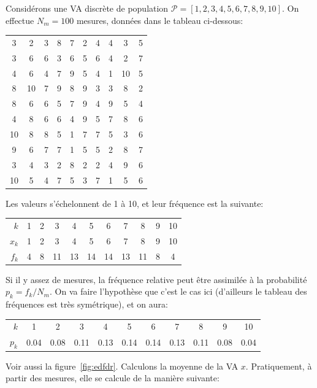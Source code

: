 Considérons une VA discrète de population $\mathcal{P}=[1,2,3,4,5,6,7,8,9,10]$. On effectue $N_m=100$ mesures, données dans le tableau ci-dessous:
\begin{center}
    \begin{tabular}{cccccccccc}
        3  & 2  & 3 & 8 & 7 & 2 & 4 & 4 & 3  & 5 \\
        3  & 6  & 6 & 3 & 6 & 5 & 6 & 4 & 2  & 7 \\
        4  & 6  & 4 & 7 & 9 & 5 & 4 & 1 & 10 & 5 \\
        8  & 10 & 7 & 9 & 8 & 9 & 3 & 3 & 8  & 2 \\
        8  & 6  & 6 & 5 & 7 & 9 & 4 & 9 & 5  & 4 \\
        4  & 8  & 6 & 6 & 4 & 9 & 5 & 7 & 8  & 6 \\
        10 & 8  & 8 & 5 & 1 & 7 & 7 & 5 & 3  & 6 \\
        9  & 6  & 7 & 7 & 1 & 5 & 5 & 2 & 8  & 7 \\
        3  & 4  & 3 & 2 & 8 & 2 & 2 & 4 & 9  & 6 \\
        10 & 5  & 4 & 7 & 5 & 3 & 7 & 1 & 5  & 6
    \end{tabular}
\end{center}
Les valeurs s'échelonnent de 1 à 10, et leur fréquence est la suivante:
\begin{center}
    \begin{tabular}{r|cccccccccc}
        $k$   & 1 & 2 & 3  & 4  & 5  & 6  & 7  & 8  & 9 & 10 \\
        $x_k$ & 1 & 2 & 3  & 4  & 5  & 6  & 7  & 8  & 9 & 10 \\
        $f_k$ & 4 & 8 & 11 & 13 & 14 & 14 & 13 & 11 & 8 & 4
    \end{tabular}
\end{center}
Si il y assez de mesures, la fréquence relative peut être assimilée à la probabilité $p_k=f_k/N_m$. On va faire l'hypothèse que c'est le cas ici (d'ailleurs le tableau des fréquences est très symétrique), et on aura:
\begin{center}
    \begin{tabular}{r|cccccccccc}
        $k$   & 1    & 2    & 3    & 4    & 5    & 6    & 7    & 8    & 9    & 10   \\
        $p_k$ & 0.04 & 0.08 & 0.11 & 0.13 & 0.14 & 0.14 & 0.13 & 0.11 & 0.08 & 0.04
    \end{tabular}
\end{center}
Voir aussi la figure~\ref{fig:edfdr}. Calculons la moyenne de la VA $x$. Pratiquement, à partir des mesures, elle se calcule de la manière suivante:
